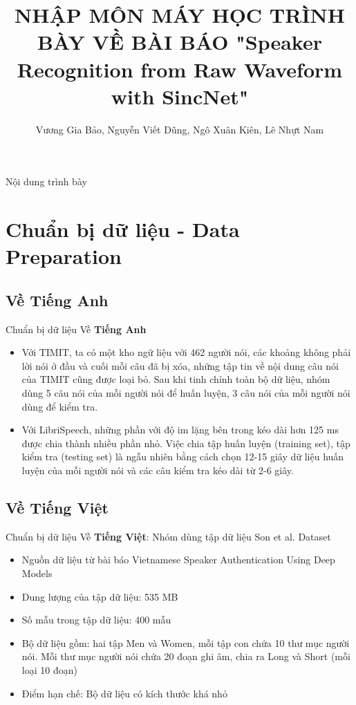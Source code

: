 \documentclass[11pt]{beamer}
\author{Vương Gia Bảo, Nguyễn Viết Dũng, Ngô Xuân Kiên, Lê Nhựt Nam}
\title{NHẬP MÔN MÁY HỌC \newline  TRÌNH BÀY VỀ BÀI BÁO "Speaker Recognition from Raw Waveform with SincNet"}
\institute{Đại học Khoa học Tự nhiên, Đại học Quốc gia TP HCM}
\begin{document}
\begin{frame}
\titlepage
\end{frame}

\begin{frame}{Nội dung trình bày}
\tableofcontents
\end{frame}
\section{Chuẩn bị dữ liệu - Data Preparation}
\subsection{Về \textbf{Tiếng Anh}}
\begin{frame}{Chuẩn bị dữ liệu}
	Về \textbf{Tiếng Anh}
	\begin{itemize}
		\item Với TIMIT, ta có một kho ngữ liệu với 462 người nói, các khoảng không phải lời nói ở đầu và cuối mỗi câu đã bị xóa, những tập tin về nội dung câu nói của TIMIT cũng được loại bỏ. Sau khi tinh chỉnh toàn bộ dữ liệu, nhóm dùng 5 câu nói của mỗi người nói để huấn luyện, 3 câu nói của mỗi người nói dùng để kiểm tra.
		\item Với LibriSpeech, những phần với độ im lặng bên trong kéo dài hơn 125 ms được
		chia thành nhiều phần nhỏ. Việc chia tập huấn luyện (training set), tập kiểm tra (testing set) là ngẫu nhiên bằng cách chọn 12-15 giây dữ liệu huấn luyện của mỗi người nói và các câu kiểm tra kéo dài từ 2-6 giây.
	\end{itemize}
\end{frame}
\subsection{Về \textbf{Tiếng Việt}}
\begin{frame}{Chuẩn bị dữ liệu}
	Về \textbf{Tiếng Việt}: Nhóm dùng tập dữ liệu Son et al. Dataset
	\begin{itemize}
		\item Nguồn dữ liệu từ bài báo Vietnamese Speaker Authentication Using Deep Models
		\item Dung lượng của tập dữ liệu: 535 MB
		\item Số mẫu trong tập dữ liệu: 400 mẫu
		\item Bộ dữ liệu gồm: hai tập Men và Women, mỗi tập con chứa 10 thư mục người nói. Mỗi thư mục người nói chứa 20 đoạn ghi âm, chia ra Long và Short (mỗi loại 10 đoạn)
		\item Điểm hạn chế: Bộ dữ liệu có kích thước khá nhỏ
	\end{itemize}
\end{frame}
\end{document}
